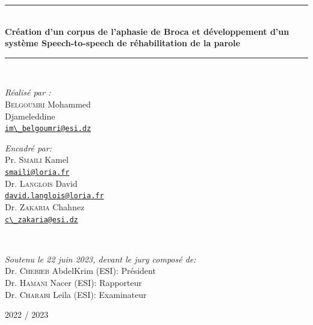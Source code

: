 {\begin{titlepage}
    \rule{\linewidth}{0.3mm} \\[0.4cm]
    {
    \Large \bfseries
    Création d'un corpus de l'aphasie de Broca
    et développement d'un système Speech-to-speech de réhabilitation de la parole\\
    }
    \rule{\linewidth}{0.3mm} \\[1cm]

    \vspace{10mm}

    \noindent
    \begin{minipage}{0.6\textwidth}
      \vspace{-7mm}
      \begin{flushleft} \large
        \emph{Réalisé par :}\\
        \textsc{Belgoumri} Mohammed \\Djameleddine\\
        \href{mailto:im_belgoumri@esi.dz}{\verb!im\_belgoumri@esi.dz!}
      \end{flushleft}
    \end{minipage}
    \begin{minipage}{0.35\textwidth}
      \begin{flushright} \large
        \begin{flushleft} \large
          \emph{Encadré par:} \\
          {
          Pr. \textsc{Smaili} Kamel\\[0.1cm]
          \href{mailto:smaili@loria.fr}{\verb!smaili@loria.fr!}\\[0.1cm]
          Dr. \textsc{Langlois} David\\[0.1cm]
          \href{mailto:david.langlois@loria.fr}{\verb!david.langlois@loria.fr!}\\[0.1cm]
          Dr. \textsc{Zakaria} Chahnez\\[0.1cm]
          \href{mailto:c_zakaria@esi.dz}{\verb!c\_zakaria@esi.dz!}\\
          }
        \end{flushleft}
      \end{flushright}
    \end{minipage}\\[1cm]

    \begin{minipage}{.7\linewidth}
      \begin{center}
        \begin{flushleft}
          \emph{Soutenu le 22 juin 2023, devant le jury composé de:}\\
          Dr. \textsc{Chebieb} AbdelKrim (ESI): Président\\
          Dr. \textsc{Hamani} Nacer (ESI): Rapporteur\\
          Dr. \textsc{Charabi} Leila (ESI): Examinateur\\
        \end{flushleft}
      \end{center}
    \end{minipage}

    \vfill

    {\large 2022 / 2023}
  \end{titlepage}
  \restoregeometry
}